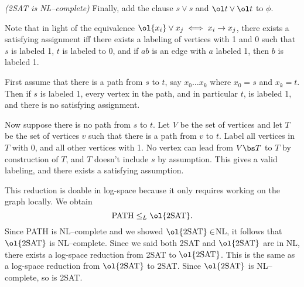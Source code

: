\begin{problem}{\it(2SAT is NL--complete)}
Finally, add the clause $s\vee s$ and $\ol t\vee \ol t$ to $\phi$.

Note that in light of the equivalence $\ol{x_i}\vee x_j\iff x_i\to x_j$, there exists a satisfying assignment iff there exists a labeling of vertices with 1 and 0 such that $s$ is labeled 1, $t$ is labeled to 0, and if $ab$ is an edge with $a$ labeled 1, then $b$ is labeled 1. 

First assume that there is a path from $s$ to $t$, say $x_0\ldots x_k$ where $x_0=s$ and $x_k=t$. Then if $s$ is labeled 1, every vertex in the path, and in particular $t$, is labeled 1, and there is no satisfying assignment.

Now suppose there is no path from $s$ to $t$. Let $V$ be the set of vertices and let $T$ be the set of vertices $v$ such that there is a path from $v$ to $t$. Label all vertices in $T$ with 0, and all other vertices with 1. No vertex can lead from $V\bs T$ to $T$ by construction of $T$, and $T$ doesn't include $s$ by assumption. This gives a valid labeling, and there exists a satisfying assumption.

This reduction is doable in log-space because it only requires working on the graph locally. 
We obtain
\[\text{PATH}\le_L\ol{\text{2SAT}}.\]
Since PATH is NL--complete and we showed $\ol{\text{2SAT}}\in$NL, it follows that $\ol{\text{2SAT}}$ is NL--complete. Since we said both 2SAT and $\ol{\text{2SAT}}$ are in NL, there exists a log-space reduction from 2SAT to $\ol{\text{2SAT}}$. This is the same as a log-space reduction from $\ol{\text{2SAT}}$ to 2SAT. Since $\ol{\text{2SAT}}$ is NL--complete, so is 2SAT.
\end{problem}
